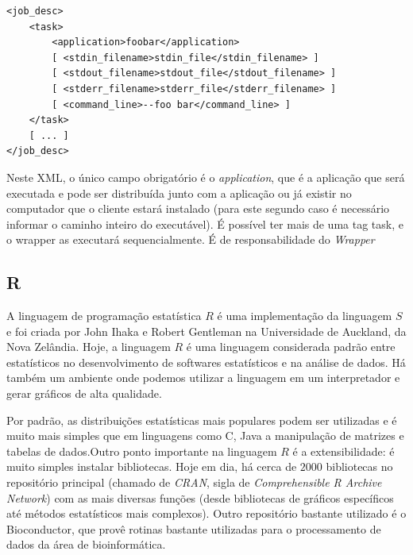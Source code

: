 \begin{verbatim}
<job_desc>
    <task>
        <application>foobar</application>
        [ <stdin_filename>stdin_file</stdin_filename> ]
        [ <stdout_filename>stdout_file</stdout_filename> ]
        [ <stderr_filename>stderr_file</stderr_filename> ]
        [ <command_line>--foo bar</command_line> ]
    </task>
    [ ... ]
</job_desc>
\end{verbatim}

Neste XML, o único campo obrigatório é o \emph{application}, que é a aplicação
que será executada e pode ser distribuída junto com a aplicação ou já existir no 
computador que o cliente estará instalado (para este segundo caso é necessário
informar o caminho inteiro do executável). É possível ter mais de uma tag
task, e o wrapper as executará sequencialmente. É de responsabilidade
do \textit{Wrapper} 

\subsection{R}


A linguagem de programação estatística $R$ é uma implementação da linguagem $S$ e foi criada por John Ihaka e Robert
Gentleman na Universidade de Auckland, da Nova Zelândia. Hoje, a linguagem $R$ é uma linguagem considerada padrão
entre estatísticos no desenvolvimento de softwares estatísticos e na análise de dados. Há também um ambiente 
onde podemos utilizar a linguagem em um interpretador e gerar gráficos de alta qualidade. 

Por padrão, as distribuições estatísticas mais populares podem ser utilizadas e é muito mais simples que em 
linguagens como C, Java a manipulação de matrizes e tabelas de dados.Outro ponto importante na linguagem $R$ 
é a extensibilidade: é muito simples instalar bibliotecas. Hoje em dia, há
cerca de $2000$ bibliotecas no repositório principal (chamado de \emph{CRAN}, 
sigla de \textit{Comprehensible R Archive Network}) com as mais diversas funções 
(desde bibliotecas de gráficos específicos até métodos estatísticos mais complexos). 
Outro repositório bastante utilizado é o Bioconductor, que provê rotinas bastante utilizadas para o processamento
de dados da área de bioinformática.





